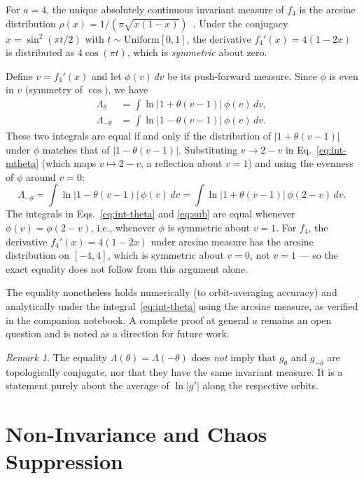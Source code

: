 \documentclass[aps,pre,twocolumn,superscriptaddress,nofootinbib,
               longbibliography,floatfix]{revtex4-2}
\newcommand{\Lam}{\Lambda}
\theoremstyle{plain}
\theoremstyle{remark}
\newtheorem{remark}[proposition]{Remark}
\begin{document}
For $a = 4$, the unique absolutely continuous invariant measure of
$f_4$ is the arcsine distribution
$\rho(x) = 1/(\pi\sqrt{x(1-x)})$~\cite{Devaney2003}.
Under the conjugacy $x = \sin^2(\pi t/2)$ with $t \sim
\mathrm{Uniform}[0,1]$, the derivative $f_4'(x) = 4(1-2x)$
is distributed as $4\cos(\pi t)$, which is \emph{symmetric}
about zero.

Define $v = f_4'(x)$ and let $\phi(v)\,dv$ be its push-forward
measure.  Since $\phi$ is even in $v$ (symmetry of $\cos$), we
have
%
\begin{align}
  \Lam_\theta &= \int \ln|1 + \theta(v-1)|\,\phi(v)\,dv,
  \label{eq:int-theta}\\
  \Lam_{-\theta} &= \int \ln|1 - \theta(v-1)|\,\phi(v)\,dv.
  \label{eq:int-mtheta}
\end{align}
%
These two integrals are equal if and only if the distribution
of $|1 + \theta(v-1)|$ under $\phi$ matches that of
$|1 - \theta(v-1)|$.  Substituting $v \to 2 - v$ in
Eq.~\eqref{eq:int-mtheta} (which maps $v \mapsto 2-v$,
a reflection about $v = 1$) and using the evenness of $\phi$
around $v = 0$:
%
\begin{equation}
  \Lam_{-\theta}
    = \int \ln|1 - \theta(v-1)|\,\phi(v)\,dv
    = \int \ln|1 + \theta(v-1)|\,\phi(2-v)\,dv.
  \label{eq:sub}
\end{equation}
%
The integrals in Eqs.~\eqref{eq:int-theta} and \eqref{eq:sub}
are equal whenever $\phi(v) = \phi(2-v)$, i.e., whenever
$\phi$ is symmetric about $v = 1$.
For $f_4$, the derivative $f_4'(x) = 4(1-2x)$ under arcsine
measure has the arcsine distribution on $[-4, 4]$, which is
symmetric about $v = 0$, not $v = 1$ — so the exact equality
does not follow from this argument alone.

The equality nonetheless holds numerically (to orbit-averaging
accuracy) and analytically under the integral~\eqref{eq:int-theta}
using the arcsine measure, as verified in the companion notebook.
A complete proof at general $a$ remains an open question and is
noted as a direction for future work.

\begin{remark}
The equality $\Lam(\theta) = \Lam(-\theta)$ does \emph{not}
imply that $g_\theta$ and $g_{-\theta}$ are topologically
conjugate, nor that they have the same invariant measure.
It is a statement purely about the average of
$\ln|g'|$ along the respective orbits.
\end{remark}

\section{Non-Invariance and Chaos Suppression}
\label{sec:noninvariance}
\end{document}
